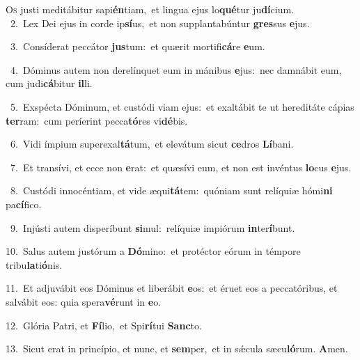 \lettrine{\initial\textcolor{\initialcolor}{O}}{s} justi meditábitur sapi\-\textbf{én}\-tiam,~\star et lingua ejus lo\-\textbf{qué}\-tur ju\-\textbf{dí}\-cium.\\
{\numbfont\textcolor{\numbcolor}{~2.}}~Lex Dei ejus in corde ip\-\textbf{sí}\-us,~\star et non supplantabúntur \textbf{gres}\-sus \textbf{e}\-jus.\par
{\numbfont\textcolor{\numbcolor}{~3.}}~Consíderat peccátor \textbf{jus}\-tum:~\star et quærit mortifi\-\textbf{cá}\-re \textbf{e}\-um.\par
{\numbfont\textcolor{\numbcolor}{~4.}}~Dóminus autem non derelínquet eum in mánibus \textbf{e}\-jus:~\star nec damnábit eum, cum judi\-\textbf{cá}\-bitur \textbf{il}\-li.\par
{\numbfont\textcolor{\numbcolor}{~5.}}~Exspécta Dóminum, et custódi viam ejus:~\dagger et exaltábit te ut hereditáte cápias \textbf{ter}\-ram:~\star cum períerint pecca\-\textbf{tó}\-res vi\-\textbf{dé}\-bis.\par
{\numbfont\textcolor{\numbcolor}{~6.}}~Vidi ímpium superexal\-\textbf{tá}\-tum,~\star et elevátum sicut \textbf{ce}\-dros \textbf{Lí}\-bani.\par
{\numbfont\textcolor{\numbcolor}{~7.}}~Et transívi, et ecce non \textbf{e}\-rat:~\star et quæsívi eum, et non est invéntus \textbf{lo}\-cus \textbf{e}\-jus.\par
{\numbfont\textcolor{\numbcolor}{~8.}}~Custódi innocéntiam, et vide æqui\-\textbf{tá}\-tem:~\star quóniam sunt relíquiæ hómi\textbf{ni} pa\-\textbf{cí}\-fico.\par
{\numbfont\textcolor{\numbcolor}{~9.}}~Injústi autem disperíbunt \textbf{si}\-mul:~\star relíquiæ impiórum \textbf{in}\-ter\-\textbf{í}\-bunt.\par
{\numbfont\textcolor{\numbcolor}{10.}}~Salus autem justórum a \textbf{Dó}\-mino:~\star et protéctor eórum in témpore tribu\-\textbf{la}\-ti\-\textbf{ó}\-nis.\par
{\numbfont\textcolor{\numbcolor}{11.}}~Et adjuvábit eos Dóminus et liberábit \textbf{e}\-os:~\star et éruet eos a peccatóribus, et salvábit eos: quia spera\-\textbf{vé}\-runt in \textbf{e}\-o.\par
{\numbfont\textcolor{\numbcolor}{12.}}~Glória Patri, et \textbf{Fí}\-lio,~\star et Spi\-\textbf{rí}\-tui \textbf{Sanc}\-to.\par
{\numbfont\textcolor{\numbcolor}{13.}}~Sicut erat in princípio, et nunc, et \textbf{sem}\-per,~\star et in sǽcula sæcu\-\textbf{ló}\-rum. \textbf{A}\-men.\par
